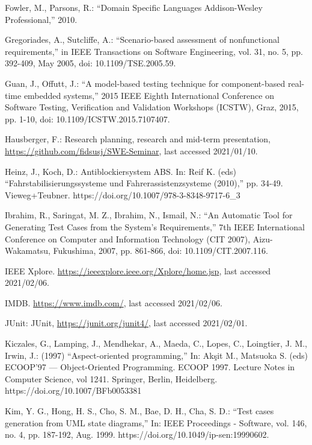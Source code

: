 \documentclass[a4paper,10pt, bibliography=totocnumbered]{scrreprt}
\begin{document}
\begin{thebibliography}{9}
 Fowler, M., Parsons, R.: \enquote{Domain Specific Languages
Addison-Wesley Professional,} 2010.

 Gregoriades, A., Sutcliffe, A.: \enquote{Scenario-based assessment of nonfunctional requirements,} in IEEE Transactions on Software Engineering, vol. 31, no. 5, pp. 392-409, May 2005, doi: 10.1109/TSE.2005.59.

 Guan, J., Offutt, J.: \enquote{A model-based testing technique for component-based real-time embedded systems,} 2015 IEEE Eighth International Conference on Software Testing, Verification and Validation Workshops (ICSTW), Graz, 2015, pp. 1-10, doi: 10.1109/ICSTW.2015.7107407.

 Hausberger, F.: Research planning, research and mid-term presentation, \url{https://github.com/fidsusj/SWE-Seminar}, last accessed 2021/01/10.

 Heinz, J., Koch, D.: Antiblockiersystem ABS.
In: Reif K. (eds) \enquote{Fahrstabilisierungssysteme und Fahrerassistenzsysteme (2010),} pp. 34-49. Vieweg+Teubner. 
https://doi.org/10.1007/978-3-8348-9717-6\_3

 Ibrahim, R., Saringat, M. Z., Ibrahim, N., Ismail, N.: \enquote{An Automatic Tool for Generating Test Cases from the System's Requirements,} 7th IEEE International Conference on Computer and Information Technology (CIT 2007), Aizu-Wakamatsu, Fukushima, 2007, pp. 861-866, doi: 10.1109/CIT.2007.116.

 IEEE Xplore. \url{https://ieeexplore.ieee.org/Xplore/home.jsp}, last accessed 2021/02/06.

 IMDB. \url{https://www.imdb.com/}, last accessed 2021/02/06.

 JUnit: JUnit, \url{https://junit.org/junit4/}, last accessed 2021/02/01.

 Kiczales, G., Lamping, J., Mendhekar, A., Maeda, C., Lopes, C., Loingtier, J. M., Irwin, J.: (1997) \enquote{Aspect-oriented programming,} In: Akşit M., Matsuoka S. (eds) ECOOP'97 — Object-Oriented Programming. ECOOP 1997. Lecture Notes in Computer Science, vol 1241. Springer, Berlin, Heidelberg.
https://doi.org/10.1007/BFb0053381

 Kim, Y. G., Hong, H. S., Cho, S. M., Bae, D. H., Cha, S. D.: \enquote{Test cases generation from UML state diagrams,}
In: IEEE Proceedings - Software, vol. 146, no. 4, pp. 187-192, Aug. 1999.
https://doi.org/10.1049/ip-sen:19990602.


\end{thebibliography}
\end{document}
